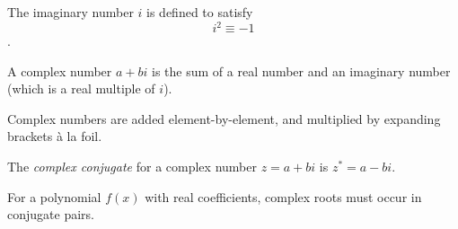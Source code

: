 \documentclass[../main.tex]{subfile}
\begin{document}

The imaginary number $i$ is defined to satisfy $$\boxed{i^2 \equiv -1}$$.

A complex number $a + bi$ is the sum of a real number and an imaginary number (which is a real multiple of $i$).

Complex numbers are added element-by-element, and multiplied by expanding brackets à la foil.

The \textit{complex conjugate} for a complex number $z = a + bi$ is $z^* = a - bi$.

For a polynomial $f(x)$ with real coefficients, complex roots must occur in conjugate pairs.
\end{document}
